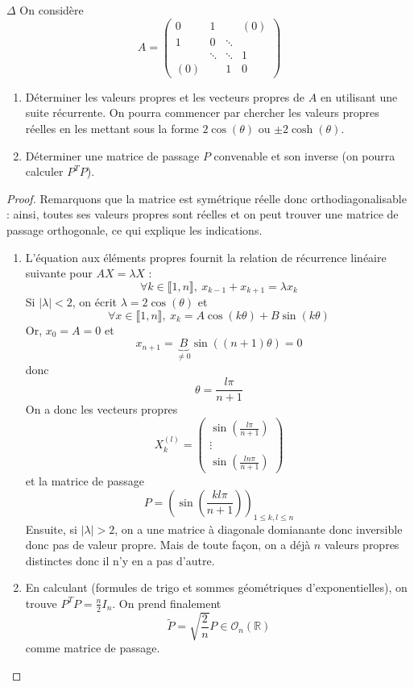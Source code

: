 \documentclass[french,a4paper]{article}
\newcommand{\R}{\mathbb{R}}
\theoremstyle{plain}
\theoremstyle{definition}
\theoremstyle{remark}
\begin{document}
\begin{ex}{$\Delta$}
	On considère $$A=\begin{pmatrix}
		0&1&&(0)\\
		1&0&\ddots&\\
		&\ddots&\ddots&1 \\
		(0)&&1&0
	\end{pmatrix}$$
	\begin{enumerate}
		\item Déterminer les valeurs propres et les vecteurs propres de $A$ en utilisant une suite récurrente. On pourra commencer par chercher les valeurs propres réelles en les mettant sous la forme $2\cos(\theta)$ ou $\pm2\cosh(\theta)$.
		\item Déterminer une matrice de passage $P$ convenable et son inverse (on pourra calculer $P^TP$).
	\end{enumerate}
\end{ex}
\begin{proof} Remarquons que la matrice est symétrique réelle donc orthodiagonalisable : ainsi, toutes ses valeurs propres sont réelles et on peut trouver une matrice de passage orthogonale, ce qui explique les indications.
	\begin{enumerate}
		\item L'équation aux éléments propres fournit la relation de récurrence linéaire suivante pour $AX=\lambda X$ : $$\forall k\in\llbracket1,n\rrbracket,\ x_{k-1}+x_{k+1}=\lambda x_k$$ Si $\lvert\lambda\rvert <2$, on écrit $\lambda=2\cos(\theta)$ et $$\forall x\in\llbracket1,n\rrbracket,\ x_k=A\cos(k\theta)+B\sin(k\theta)$$ Or, $x_0=A=0$ et $$x_{n+1}=\underbrace{B}_{\ne0}\sin((n+1)\theta)=0$$ donc $$\theta=\frac{l\pi}{n+1}$$ On a donc les vecteurs propres $$X_k^{(l)}=\begin{pmatrix}
			\sin\left(\frac{l\pi}{n+1}\right)\\
			\vdots \\
			\sin\left(\frac{ln\pi}{n+1}\right)
		\end{pmatrix}$$ et la matrice de passage $$P=\left(\sin\left(\frac{kl\pi}{n+1}\right)\right)_{1\leqslant k,l\leqslant n}$$ Ensuite, si $\lvert\lambda\rvert >2$, on a une matrice à diagonale domianante donc inversible donc pas de valeur propre. Mais de toute façon, on a déjà $n$ valeurs propres distinctes donc il n'y en a pas d'autre.
		\item En calculant (formules de trigo et sommes géométriques d'exponentielles), on trouve $P^TP=\displaystyle\frac{n}{2}I_n$. On prend finalement $$\tilde{P}=\sqrt{\frac{2}{n}}P\in\mathcal{O}_n(\R)$$ comme matrice de passage.
	\end{enumerate}
\end{proof}
\end{document}
